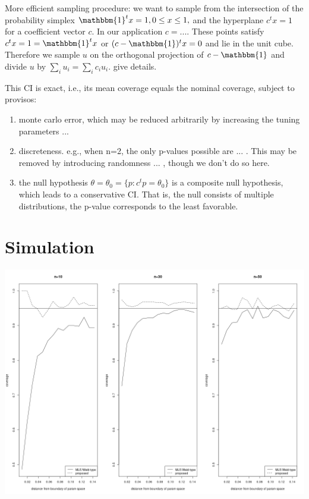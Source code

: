 \message{ !name(manuscript.tex)}\documentclass{article}
\newcommand{\p}p
\renewcommand{\c}c
\begin{document}
More efficient sampling procedure: we want to sample from the
intersection of the probability simplex
$\mathbbm{1}^tx=1, 0\le x\le 1,$ and the hyperplane $\c^t x=1$ for a
coefficient vector $\c$. In our application $\c= ...$. These points
satisfy $c^t x=1=\mathbbm{1}^t x$ or $(c - \mathbbm{1})^t x = 0$ and
lie in the unit cube. Therefore we sample $u$ on the orthogonal
projection of $c - \mathbbm{1}$ and divide $u$ by
$\sum_i u_i = \sum_i c_iu_i$. give details.

This CI is exact, i.e., its mean coverage equals the nominal coverage, subject to provisos:
\begin{enumerate}
\item monte carlo error, which may be reduced arbitrarily by increasing the tuning parameters ...
\item discreteness. e.g., when n=2, the only p-values possible are
  ... . This may be removed by introducing randomness ... , though we
  don't do so here.
\item the null hypothesis $\theta=\theta_0=\{\p : \c^t\p=\theta_0\}$
  is a composite null hypothesis, which leads to a conservative
  CI. That is, the null consists of multiple distributions, the
  p-value corresponds to the least favorable.
\end{enumerate}


\section{Simulation}

\includegraphics[width=\textwidth]{coverage.png}
\end{document}

